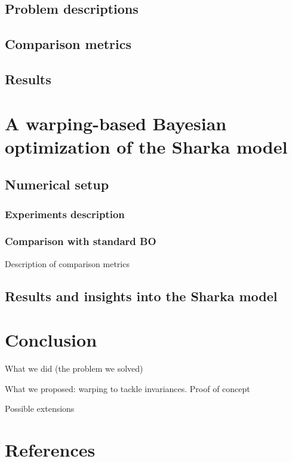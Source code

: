 \subsection{Problem descriptions}

\subsection{Comparison metrics}

\subsection{Results}

\section{A warping-based Bayesian optimization of the Sharka model}

\subsection{Numerical setup}

\subsubsection{Experiments description}


\subsubsection{Comparison with standard BO}

Description of comparison metrics


\subsection{Results and insights into the Sharka model}

\section{Conclusion}

What we did (the problem we solved)

What we proposed: warping to tackle invariances. Proof of concept

Possible extensions

\section*{References}

